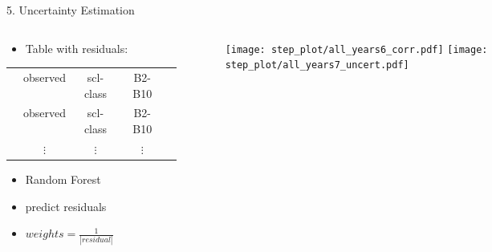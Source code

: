\begin{frame}[t]{5. Uncertainty Estimation}
    \begin{columns}
        \begin{column}{0.45\textwidth}
            \begin{itemize}
                \item Table with residuals:
            \end{itemize}

            \scriptsize
            \begin{tabular}{| c |  c c c c |}
                \hline
                \color{myred}{residuals}    & observed & scl-class & B2-B10   & \color{mygray}{weather}  \\
                \color{myred}{residuals}    & observed & scl-class & B2-B10   & \color{mygray}{weather}  \\
                \color{myred}{$\vdots$    } & $\vdots$ & $\vdots$  & $\vdots$ & \color{mygray}{$\vdots$} \\
            \end{tabular}\normalsize \vspace{0.5cm}

            \begin{itemize}
                \item Random Forest
                \item predict residuals
                \item $weights = \frac{1}{|residual|}$
            \end{itemize}
        \end{column}
        \begin{column}{0.45\textwidth}
            \begin{figure}
                \vspace{-1.6cm}
                \texttt{[image: step\_plot/all\_years6\_corr.pdf]}
                \texttt{[image: step\_plot/all\_years7\_uncert.pdf]}
            \end{figure}
        \end{column}
    \end{columns}
\end{frame}

